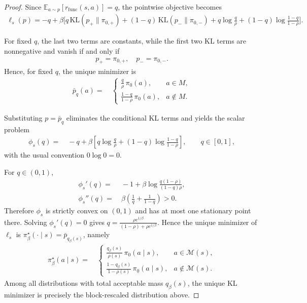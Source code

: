 \begin{proof}
Since $\mathbb E_{a\sim p}[r_{\mathrm{func}}(s,a)]=q$, the pointwise objective becomes
\begin{align*}
\ell_s(p)
= -q
+ \beta\Bigg[
q\,\mathrm{KL}(p_+\|\pi_{0,+})
+ (1-q)\,\mathrm{KL}(p_-\|\pi_{0,-})
+ q\log\frac{q}{\rho}
+ (1-q)\log\frac{1-q}{1-\rho}
\Bigg].
\end{align*}

For fixed $q$, the last two terms are constants, while the first two KL terms are nonnegative and vanish if and only if
\begin{align*}
p_+= \pi_{0,+}, \quad
p_-= \pi_{0,-}.
\end{align*}
Hence, for fixed $q$, the unique minimizer is
\begin{align*}
\bar p_q(a)= &~
\begin{cases}
\displaystyle \frac{q}{\rho}\,\pi_0(a), & a\in M,\\[1.1ex]
\displaystyle \frac{1-q}{1-\rho}\,\pi_0(a), & a\notin M.
\end{cases}
\end{align*}

Substituting $p=\bar p_q$ eliminates the conditional KL terms and yields the scalar problem
\begin{align*}
\phi_s(q)= &~ -q
+ \beta\left[
q\log\frac{q}{\rho}
+ (1-q)\log\frac{1-q}{1-\rho}
\right],
\qquad q\in[0,1],
\end{align*}
with the usual convention $0\log 0 = 0$.

For $q\in(0,1)$,
\begin{align*}
\phi_s'(q)= &~ -1 + \beta\log\frac{q(1-\rho)}{(1-q)\rho}, \\
\phi_s''(q)= &~ \beta\left(\frac{1}{q}+\frac{1}{1-q}\right) > 0.
\end{align*}
Therefore $\phi_s$ is strictly convex on $(0,1)$ and has at most one stationary point there. Solving $\phi_s'(q)=0$ gives $q= \frac{\rho e^{1/\beta}}{(1-\rho)+\rho e^{1/\beta}}$.
Hence the unique minimizer of $\ell_s$ is $\pi_\beta^\star(\cdot\mid s)=\bar p_{q_\beta(s)}$, namely
\begin{align}\label{eq:pi-beta-star}
\pi_\beta^\star(a\mid s)= &~
\begin{cases}
\displaystyle \frac{q_\beta(s)}{\rho(s)}\,\pi_0(a\mid s), & a\in \mathcal M(s),\\[1.1ex]
\displaystyle \frac{1-q_\beta(s)}{1-\rho(s)}\,\pi_0(a\mid s), & a\notin \mathcal M(s).
\end{cases}
\end{align}
Among all distributions with total acceptable mass $q_\beta(s)$, the unique KL minimizer is precisely the block-rescaled distribution above.


\end{proof}
